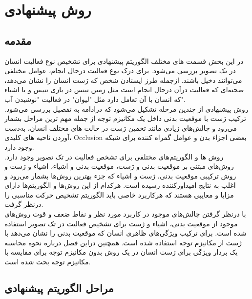 \chapter{روش پیشنهادی}
\section{مقدمه} 

در این بخش قسمت های مختلف الگوریتم پیشنهادی برای تشخیص نوع فعالیت انسان در تک تصویر بررسی می‌شود. برای درک نوع فعالیت درحال انجام، عوامل مختلفی می‌توانند دخیل ‌باشند. ازجمله طرز ایستادن شخص که ژست انسان را نشان می‌دهد،‌ صحنه‌ای که فعالیت درآن درحال انجام است مثل زمین تینس در بازی تنیس و یا اشیاء که انسان با آن تعامل دارد مثل "لیوان" در فعالیت "نوشیدن آب".\\
روش پیشنهادی از چندین مرحله تشکیل می‌شود که درادامه به تفصیل بررسی می‌شود. ترکیب ژست با موقعیت بدنی داخل یک مکانیزم توجه از جمله مهم ترین مراحل بشمار می‌رود و چالش‌های زیادی مانند تخمین ژست در حالت های مختلف انسان،‌ به‌دست آوردن ناحیه های کلیدی،‌ %
\gls{Occlusion}
بعضی اجزاء بدن و عوامل گمراه کننده برای شبکه وجود دارد.\\
روش ها و الگوریتم‌های مختلفی برای تشخص فعالیت در تک تصویر وجود دارد. روش‌های مبتنی بر موقعیت بدنی و ژست، موقعیت بدنی و اشیاء، اشیاء و ژست و روش ترکیبی موقعیت بدنی، ژست و اشیاء که جزء بهترین روش‌‌ها بشمار می‌رود و اغلب به نتایج امیداورکننده رسیده است. هرکدام از این روش‌‌ها و الگوریتم‌ها دارای مزایا و معایبی هستند که هرکاربرد خاصی باید الگوریتم تشخیص حرکت مناسبی را درنظر گرفت.\\
با درنظر گرفتن چالش‌های موجود در کاربرد مورد نظر و نقاط ضعف و قوت روش‌های موجود از موقعیت بدنی،‌ اشیاء و ژست برای تشخیص فعالیت در تک تصویر استفاده شده است. برای ترکیب ویژگی‌های ظاهری انسان که موقعیت بدنی را نشان می‌دهد با ژست از مکانیزم توجه استفاده شده است. همچنین دراین فصل درباره نحوه محاسبه یک بردار ویژگی برای ژست انسان در یک روش بدون مکانیزم توجه برای مقایسه با مکانیزم توجه بحث شده است.

\section{مراحل الگوریتم پیشنهادی}

